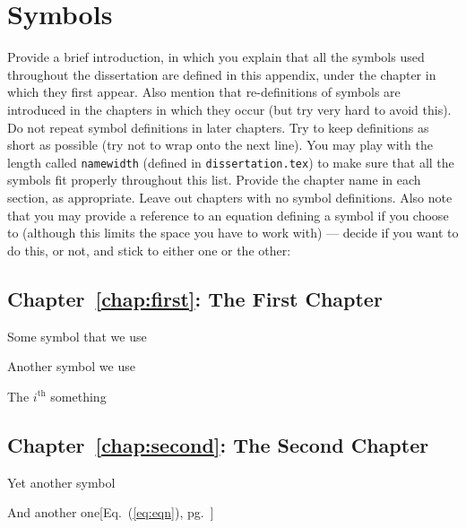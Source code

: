 
\chapter{Symbols}
\label{app:symbols}

Provide a brief introduction, in which you explain that all the symbols used throughout the dissertation are defined in this appendix, under the chapter in which they first appear. Also mention that re-definitions of symbols are introduced in the chapters in which they occur (but try very hard to avoid this). Do not repeat symbol definitions in later chapters. Try to keep definitions as short as possible (try not to wrap onto the next line). You may play with the length called \texttt{namewidth} (defined in \texttt{dissertation.tex}) to make sure that all the symbols fit properly throughout this list. Provide the chapter name in each section, as appropriate. Leave out chapters with no symbol definitions. Also note that you may provide a reference to an equation defining a symbol if you choose to (although this limits the space you have to work with) --- decide if you want to do this, or not, and stick to either one or the other:


\section{Chapter~\ref{chap:first}: The First Chapter}
\label{sec:symbols:first}

\begin{description}
\setlength{\itemsep}{-1mm}
	\item[\parbox{\namewidth}{$\cal A$}] Some symbol that we use
	\item[\parbox{\namewidth}{$m$}] Another symbol we use
	\item[\parbox{\namewidth}{$t_{i}$}] The $i^{\mathrm{th}}$ something
\end{description}


\section{Chapter~\ref{chap:second}: The Second Chapter}
\label{sec:symbols:SOM}

\begin{description}
\setlength{\itemsep}{-1mm}
	\item[\parbox{\namewidth}{$\beta$}] Yet another symbol
	\item[\parbox{\namewidth}{$\eta(t)$}] And another one\hfill[Eq.~(\ref{eq:eqn}), pg.~\pageref{eq:eqn}]
\end{description}

